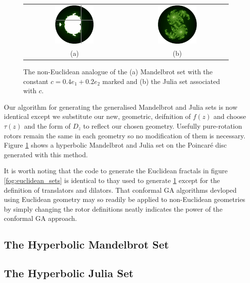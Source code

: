 \begin{figure}
\centering
\begin{tabular}{c@{$\quad$}c}
\includegraphics[width=0.4\textwidth]{hyp_mandel_julia_pos} 
 & \includegraphics[width=0.4\textwidth]{julia_hyp} \\
                          (a) & (b)
\end{tabular}
\caption{\label{fig:noneuclidean_sets}The non-Euclidean analogue of the (a) Mandelbrot set with
  the constant $c = 0.4e_1 + 0.2e_2$ marked and (b) the Julia
  set associated with $c$.}
\end{figure}

Our algorithm for generating the generalised Mandelbrot and Julia sets is now identical
except we substitute our new, geometric, deifnition of $f(z)$ and choose $\tau(z)$
and the form of $D_z$ to reflect our chosen geometry. Usefully pure-rotation rotors remain
the same in each geometry so no modification of them is necessary. Figure
\ref{fig:noneuclidean_sets} shows a hyperbolic Mandelbrot and Julia set on the
Poincar\'e disc generated with this method. 

It is worth noting that the code to generate the Euclidean fractals in figure 
\ref{fog:euclidean_sets} is identical to thay used to generate
\ref{fig:noneuclidean_sets} except for the definition of translators and dilators.
That conformal GA algorithms devloped using Euclidean geometry may so readily
be applied to non-Euclidean geometries by simply changing the rotor definitions neatly
indicates the power of the conformal GA approach.

\subsection{The Hyperbolic Mandelbrot Set}

\subsection{The Hyperbolic Julia Set}
